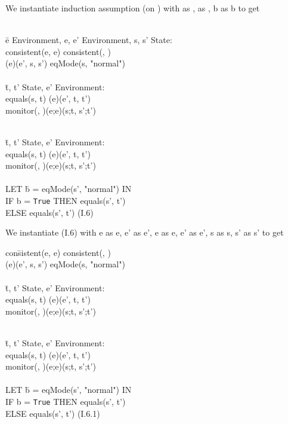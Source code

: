 \documentclass[conference]{IEEEtran}
\begin{document}
\noindent We instantiate induction assumption (on ) with
 as ,  as , b as b to get
\begin{tabbing}
\\ \=e  Environment, e, e'  Environment, s, s'  State:
\\\>consistent(e, e)  consistent(, )  
\\\>\textlbrackdbl \textrbrackdbl(e)(e', s, s')  eqMode(s, "normal")
\\
\\\> \=t, t'  State, e'  Environment: 
\\\>\>equals(s, t)  \textlbrackdbl \textrbrackdbl(e)(e', t, t')  
\\\>\>monitor(, )(e;e)(s;t, s';t')

\\\> \=t, t'  State, e'  Environment: 
\\\>\>equals(s, t)  \textlbrackdbl \textrbrackdbl(e)(e', t, t')  
\\\>\>monitor(, )(e;e)(s;t, s';t')
\\\> \=
\\\> LET \=b = eqMode(s', "normal") IN
\\\>\>IF b = \texttt{True} THEN equals(s', t') 
\\\>\> ELSE  equals(s', t')   \hspace*{2cm} (I.6)
\end{tabbing}

\noindent We instantiate (I.6) with
e as e, e' as e', e as e, e' as e', s as s, s' as s' to get

\begin{tabbing}
con\=sistent(e, e)  consistent(, ) 
\\\> \textlbrackdbl \textrbrackdbl(e)(e', s, s')  eqMode(s, "normal")
\\
\\\> \=t, t'  State, e'  Environment: 
\\\>\>equals(s, t)  \textlbrackdbl \textrbrackdbl(e)(e', t, t')  
\\\>\>monitor(, )(e;e)(s;t, s';t')

\\\> \=t, t'  State, e'  Environment: 
\\\>\>equals(s, t)  \textlbrackdbl \textrbrackdbl(e)(e', t, t')  
\\\>\>monitor(, )(e;e)(s;t, s';t')
\\\> \=
\\\> LET \=b = eqMode(s', "normal") IN
\\\>\>IF b = \texttt{True} THEN equals(s', t') 
\\\>\>ELSE  equals(s', t')  \hspace*{2cm} (I.6.1)
\end{tabbing}
\end{document}
